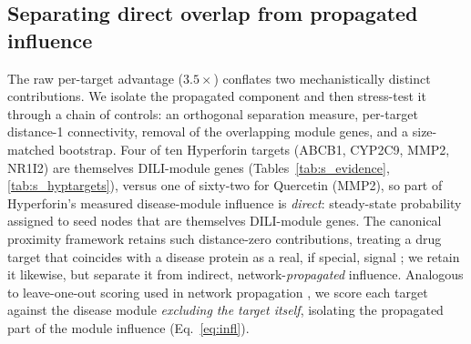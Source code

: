 \subsection{Separating direct overlap from propagated influence}

The raw per-target advantage ($3.5\times$) conflates two mechanistically distinct contributions. We isolate the propagated component and then stress-test it through a chain of controls: an orthogonal separation measure, per-target distance-1 connectivity, removal of the overlapping module genes, and a size-matched bootstrap. Four of ten Hyperforin targets (ABCB1, CYP2C9, MMP2, NR1I2) are themselves DILI-module genes (Tables~\ref{tab:s_evidence}, \ref{tab:s_hyptargets}), versus one of sixty-two for Quercetin (MMP2), so part of Hyperforin's measured disease-module influence is \emph{direct}: steady-state probability assigned to seed nodes that are themselves DILI-module genes. The canonical proximity framework retains such distance-zero contributions, treating a drug target that coincides with a disease protein as a real, if special, signal \citep{Guney2016}; we retain it likewise, but separate it from indirect, network-\emph{propagated} influence. Analogous to leave-one-out scoring used in network propagation \citep{Kohler2008, Cowen2017}, we score each target against the disease module \emph{excluding the target itself}, isolating the propagated part of the module influence (Eq.~\eqref{eq:infl}).

